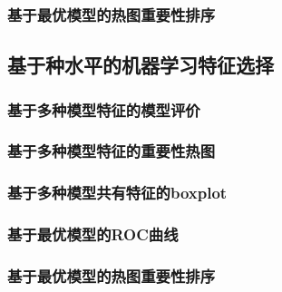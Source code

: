 \documentclass[
]{article}
\begin{document}
\hypertarget{ux57faux4e8eux6700ux4f18ux6a21ux578bux7684ux70edux56feux91cdux8981ux6027ux6392ux5e8f}{%
\subsubsection{基于最优模型的热图重要性排序}\label{ux57faux4e8eux6700ux4f18ux6a21ux578bux7684ux70edux56feux91cdux8981ux6027ux6392ux5e8f}}

\hypertarget{ux57faux4e8eux79cdux6c34ux5e73ux7684ux673aux5668ux5b66ux4e60ux7279ux5f81ux9009ux62e9}{%
\subsection{基于种水平的机器学习特征选择}\label{ux57faux4e8eux79cdux6c34ux5e73ux7684ux673aux5668ux5b66ux4e60ux7279ux5f81ux9009ux62e9}}

\hypertarget{ux57faux4e8eux591aux79cdux6a21ux578bux7279ux5f81ux7684ux6a21ux578bux8bc4ux4ef7-1}{%
\subsubsection{基于多种模型特征的模型评价}\label{ux57faux4e8eux591aux79cdux6a21ux578bux7279ux5f81ux7684ux6a21ux578bux8bc4ux4ef7-1}}

\hypertarget{ux57faux4e8eux591aux79cdux6a21ux578bux7279ux5f81ux7684ux91cdux8981ux6027ux70edux56fe-1}{%
\subsubsection{基于多种模型特征的重要性热图}\label{ux57faux4e8eux591aux79cdux6a21ux578bux7279ux5f81ux7684ux91cdux8981ux6027ux70edux56fe-1}}

\hypertarget{ux57faux4e8eux591aux79cdux6a21ux578bux5171ux6709ux7279ux5f81ux7684boxplot-1}{%
\subsubsection{基于多种模型共有特征的boxplot}\label{ux57faux4e8eux591aux79cdux6a21ux578bux5171ux6709ux7279ux5f81ux7684boxplot-1}}

\hypertarget{ux57faux4e8eux6700ux4f18ux6a21ux578bux7684rocux66f2ux7ebf-1}{%
\subsubsection{基于最优模型的ROC曲线}\label{ux57faux4e8eux6700ux4f18ux6a21ux578bux7684rocux66f2ux7ebf-1}}

\hypertarget{ux57faux4e8eux6700ux4f18ux6a21ux578bux7684ux70edux56feux91cdux8981ux6027ux6392ux5e8f-1}{%
\subsubsection{基于最优模型的热图重要性排序}\label{ux57faux4e8eux6700ux4f18ux6a21ux578bux7684ux70edux56feux91cdux8981ux6027ux6392ux5e8f-1}}
\end{document}
